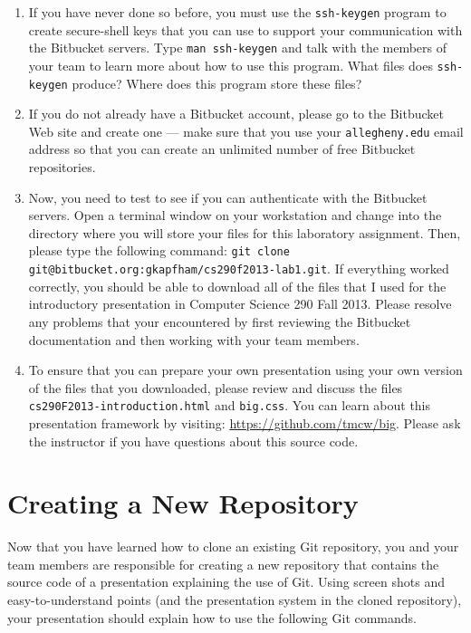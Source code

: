 \begin{enumerate}
	\item If you have never done so before, you must use the {\tt ssh-keygen} program to create secure-shell keys that
		you can use to support your communication with the Bitbucket servers.  Type {\tt man ssh-keygen} and talk with
		the members of your team to learn more about how to use this program.  What files does {\tt ssh-keygen} produce? 
		Where does this program store these files?

	\item If you do not already have a Bitbucket account, please go to the Bitbucket Web site and create one --- 
		make sure that you use your {\tt allegheny.edu} email address so that you can create an unlimited number of free
		Bitbucket repositories.

	\item Now, you need to test to see if you can authenticate with the Bitbucket servers.  Open a terminal window on
		your workstation and change into the directory where you will store your files for this laboratory assignment.
		Then, please type the following command: {\tt git clone git@bitbucket.org:gkapfham/cs290f2013-lab1.git}.  If
		everything worked correctly, you should be able to download all of the files that I used for the introductory
		presentation in Computer Science 290 Fall 2013. Please resolve any problems that your encountered by first
		reviewing the Bitbucket documentation and then working with your team members.

	\item To ensure that you can prepare your own presentation using your own version of the files that you downloaded,
		please review and discuss the files {\tt cs290F2013-introduction.html} and {\tt big.css}. You can learn about
		this presentation framework by visiting: \url{https://github.com/tmcw/big}. Please ask the instructor if you
		have questions about this source code.

\end{enumerate}

\section*{Creating a New Repository}

Now that you have learned how to clone an existing Git repository, you and your team members are responsible for
creating a new repository that contains the source code of a presentation explaining the use of Git. Using screen shots
and easy-to-understand points (and the presentation system in the cloned repository), your presentation should explain
how to use the following Git commands. 

